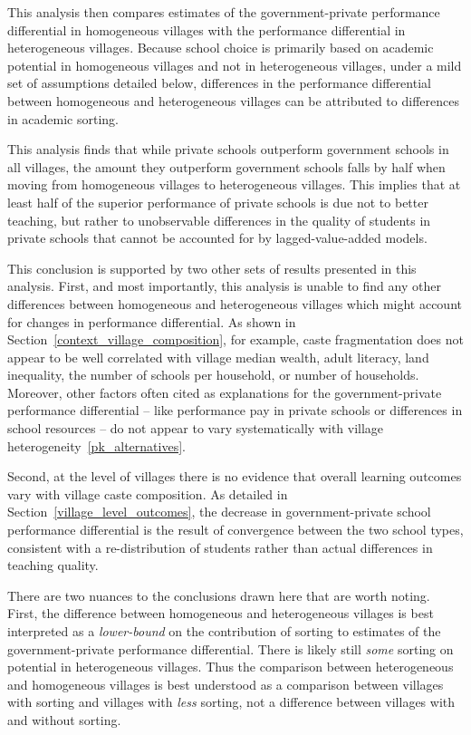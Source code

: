 \documentclass[Eubank_pk_ethnic_sorting.tex]{subfiles}
\begin{document}
This analysis then compares estimates of the government-private performance differential in homogeneous villages with the performance differential in heterogeneous villages. Because school choice is primarily based on academic potential in homogeneous villages and not in heterogeneous villages, under a mild set of assumptions detailed below, differences in the performance differential between homogeneous and heterogeneous villages can be attributed to differences in academic sorting.

This analysis finds that while private schools outperform government schools in all villages, the amount they outperform government schools falls by half when moving from homogeneous villages to heterogeneous villages. This implies that at least half of the superior performance of private schools is due not to better teaching, but rather to unobservable differences in the quality of students in private schools that cannot be accounted for by lagged-value-added models. 

This conclusion is supported by two other sets of results presented in this analysis. First, and most importantly, this analysis is unable to find any other differences between homogeneous and heterogeneous villages which might account for changes in performance differential. As shown in Section~\ref{context_village_composition}, for example, caste fragmentation does not appear to be well correlated with village median wealth, adult literacy, land inequality, the number of schools per household, or number of households. Moreover, other factors often cited as explanations for the government-private performance differential -- like performance pay in private schools or differences in school resources --  do not appear to vary systematically with village heterogeneity~\ref{pk_alternatives}. 

Second, at the level of villages there is no evidence that overall learning outcomes vary with village caste composition. As detailed in Section~\ref{village_level_outcomes}, the decrease in government-private school performance differential is the result of convergence between the two school types, consistent with a re-distribution of students rather than actual differences in teaching quality. 

There are two nuances to the conclusions drawn here that are worth noting. First, the difference between homogeneous and heterogeneous villages is best interpreted as a \emph{lower-bound} on the contribution of sorting to estimates of the government-private performance differential. There is likely still \emph{some} sorting on potential in heterogeneous villages. Thus the comparison between heterogeneous and homogeneous villages is best understood as a comparison between villages with sorting and villages with \emph{less} sorting, not a difference between villages with and without sorting. 
\end{document}
